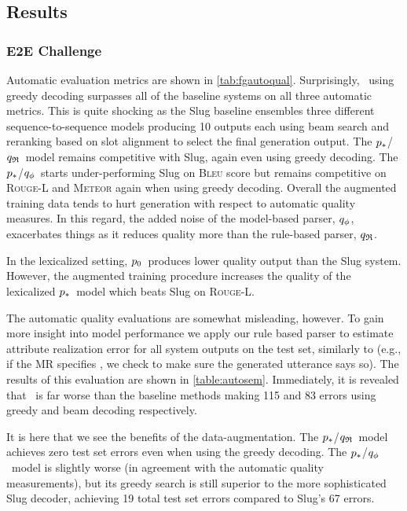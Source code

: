 



\subsection{Results}
\subsubsection{E2E Challenge}

Automatic evaluation metrics are shown in \autoref{tab:fgautoqual}.
Surprisingly, \basegen~using greedy decoding surpasses all of the baseline
systems on all three automatic metrics.  This is quite shocking as the Slug
baseline ensembles three different sequence-to-sequence models producing 10
outputs each using beam search and reranking based on slot alignment to select
the final generation output. The $p_*$/${q_{\mathfrak{R}} }$~model remains
competitive with Slug, again even using greedy decoding.  The
$p_*$/${q_{\phi} }$~starts under-performing Slug on \textsc{Bleu} score
but remains competitive on \textsc{Rouge-L} and \textsc{Meteor} again when
using greedy decoding.  Overall the augmented training data tends to hurt
generation with respect to automatic quality measures.  In this regard, the
added noise of the model-based parser, ${q_{\phi} }$, exacerbates things as it
reduces quality more than the rule-based parser, ${q_{\mathfrak{R}} }$. 

In the lexicalized setting, $p_0$~produces lower quality output than the
Slug system.  However, the augmented training procedure increases the quality
of the lexicalized $p_*$~model which beats Slug on \textsc{Rouge-L}.

The automatic quality evaluations are somewhat misleading, however. To gain
more insight into model performance we apply our rule based parser to estimate
attribute realization error for all system outputs on the test set, similarly
to \cite{dusek2019} (e.g., if the MR specifies , we check to
make sure the generated utterance says so).  The results of this evaluation are
shown in \autoref{table:autosem}.  Immediately, it is revealed that \basegen~is
far worse than the baseline methods making 115 and 83 errors using greedy and
beam decoding respectively.

It is here that we see the benefits of the data-augmentation.  The
$p_*$/${q_{\mathfrak{R}} }$~model achieves zero test set errors even when using the
greedy decoding. The $p_*$/${q_{\phi} }$~model is slightly worse (in
agreement with the automatic quality measurements), but its greedy search is
still superior to the more sophisticated Slug decoder, achieving 19 total test
set errors compared to Slug's 67 errors.

